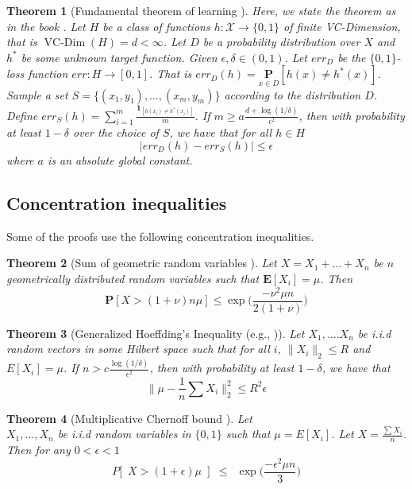 \documentclass[12pt]{article}
\newcommand{\mc}{\mathcal}
\newcommand{\mb}{\mathbf}
\DeclareMathOperator{\vcdim}{VC-Dim}
\newtheorem{theorem}{Theorem}
\begin{document}
\begin{theorem}[Fundamental theorem of learning \cite{blumer1989learnability}] 
\label{thm:uniformConvergence}
Here, we state the theorem as in the book \cite{shalev2014understanding}. Let $H$ be a class of functions $h:\mc X \rightarrow \{0, 1\}$ of finite VC-Dimension, that is $\vcdim(H) = d < \infty$. Let $D$ be a probability distribution over $X$ and $h^*$ be some unknown target function. Given $\epsilon, \delta \in (0, 1)$. Let $err_D$ be the $\{0, 1\}$-loss function $err: H \rightarrow [0, 1]$. That is $err_D(h) = \underset{x \in D}{\mb P}[h(x) \neq h^*(x)]$. Sample a set $S = \{(x_1, y_1), \ldots, (x_m, y_m)\}$ according to the distribution $D$. Define $err_S(h) = \sum_{i=1}^{m} \frac{\mb 1_{[h(x_i) \neq h^*(x_i)]}}{m}$. If $m \ge a\frac{d + \log (1/\delta)}{\epsilon^2}$, then with probability at least $1-\delta$ over the choice of $S$, we have that for all $h \in H$
$$|err_D(h) - err_S(h)| \le \epsilon$$
where $a$ is an absolute global constant. 
\end{theorem}

\subsection{Concentration inequalities}
Some of the proofs use the following concentration inequalities. 
\label{appendixsection:conIneq}
\begin{theorem}[Sum of geometric random variables \cite{brown2011wasted}]
\label{thm:geometricRV}
Let $X = X_1 + \ldots + X_n$ be $n$ geometrically distributed random variables such that $\mb E[X_i] = \mu$. Then 
$$\mb P[X > (1+\nu)n\mu] \le \exp\bigg(\frac{-\nu^2\mu n}{2(1+\nu)}\bigg)$$
\end{theorem}   

\begin{theorem}[Generalized Hoeffding's Inequality (e.g., \cite{ashtiani2015dimension})]
\label{thm:genHoeff}
Let $X_1, \ldots. X_n$ be i.i.d random vectors in some Hilbert space such that for all $i$, $\|X_i\|_2 \le R$ and $E[X_i] = \mu$. If $n > c\frac{\log(1/\delta)}{\epsilon^2}$, then with probability at least $1-\delta$, we have that
$$\Big\|\mu - \frac{1}{n}\sum X_i\Big\|_2^2 \le R^2\epsilon$$ 
\end{theorem}

\begin{theorem}[Multiplicative Chernoff bound \cite{mitzenmacher2005probability}]
\label{thm:chernoff}
Let\\ $X_1, \ldots, X_n$ be i.i.d random variables in $\{0, 1\}$ such that $\mu = E[X_i]$. Let $X = \frac{\sum X_i}{n}$. Then for any $0 < \epsilon < 1$
$$P\big[ \enspace X > (1+\epsilon) \mu\enspace\big] \enspace\le\enspace \exp\bigg(\frac{-\epsilon^2\mu n}{3}\bigg)$$
\end{theorem}
\end{document}
